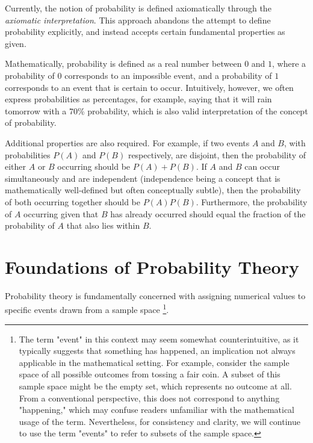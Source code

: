 Currently, the notion of probability is defined axiomatically through the \emph{axiomatic interpretation}. This approach abandons the attempt to define probability explicitly, and instead accepts certain fundamental properties as given.

Mathematically, probability is defined as a real number between $0$ and $1$, where a probability of $0$ corresponds to an impossible event, and a probability of $1$ corresponds to an event that is certain to occur. Intuitively, however, we often express probabilities as percentages, for example, saying that it will rain tomorrow with a 70\% probability, which is also valid interpretation of the concept of probability.

Additional properties are also required. For example, if two events $A$ and $B$, with probabilities $P\left(A\right)$ and $P\left(B\right)$ respectively, are disjoint, then the probability of either $A$ or $B$ occurring should be $P\left(A\right) + P\left(B\right)$. If $A$ and $B$ can occur simultaneously and are independent (independence being a concept that is mathematically well-defined but often conceptually subtle), then the probability of both occurring together should be $P\left(A\right) P\left(B\right)$. Furthermore, the probability of $A$ occurring given that $B$ has already occurred should equal the fraction of the probability of $A$ that also lies within $B$.

%
%

\section{Foundations of Probability Theory}
\label{sec:probability_foundations}

Probability theory is fundamentally concerned with assigning numerical values to specific events drawn from a sample space \footnote{The term "event" in this context may seem somewhat counterintuitive, as it typically suggests that something has happened, an implication not always applicable in the mathematical setting. For example, consider the sample space of all possible outcomes from tossing a fair coin. A subset of this sample space might be the empty set, which represents no outcome at all. From a conventional perspective, this does not correspond to anything "happening," which may confuse readers unfamiliar with the mathematical usage of the term. Nevertheless, for consistency and clarity, we will continue to use the term "events" to refer to subsets of the sample space.}.


